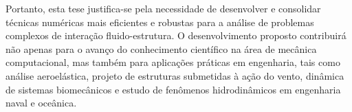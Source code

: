 \documentclass[tese_patricia.tex]{subfiles}
\begin{document}
{Portanto, esta tese justifica-se pela necessidade de desenvolver e consolidar técnicas numéricas mais eficientes e robustas para a análise de problemas complexos de interação fluido-estrutura. O desenvolvimento proposto contribuirá não apenas para o avanço do conhecimento científico na área de mecânica computacional, mas também para aplicações práticas em engenharia, tais como análise aeroelástica, projeto de estruturas submetidas à ação do vento, dinâmica de sistemas biomecânicos e estudo de fenômenos hidrodinâmicos em engenharia naval e oceânica.}

%
%
\end{document}
